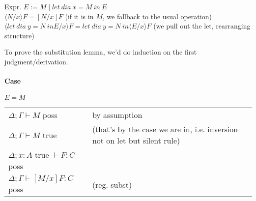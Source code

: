 \documentclass[12 pt]{article}
\begin{document}
      Expr. $E := M \mid let\ dia\ x = M\ in\ E$
      \\ $\langle N/x \rangle F = [N/x] F$ (if it is in $M$, we
      fallback to the usual operation)
      \\ $\langle let\ dia\ y = N\ in E /x \rangle F = let\ dia\ y =
      N\ in \langle E/x \rangle F$ (we pull out the let, rearranging
      structure)

      To prove the substitution lemma, we'd do induction on the first
      judgment/derivation.
      \paragraph{Case} $E = M$
      \\
      \begin{tabular}{l l}
        $\Delta; \Gamma \vdash M$ poss& by assumption
        \\ $\Delta; \Gamma \vdash M$ true & (that's by the case we are in, i.e. inversion not on let but silent rule)
        \\ $\Delta; x : A$ true $\vdash F : C$ poss
        \\ $\Delta; \Gamma \vdash [M/x] F : C$ poss & (reg. subst)
      \end{tabular}
\end{document}
